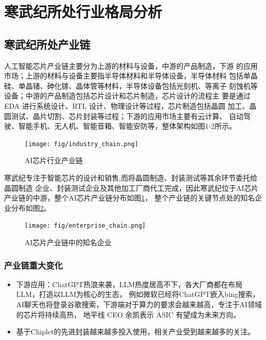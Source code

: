 
\section{寒武纪所处行业格局分析}
\subsection{寒武纪所处产业链}
人工智能芯片产业链主要分为上游的材料与设备，中游的产品制造，下游
的应用市场；上游的材料与设备主要指半导体材料和半导体设备，半导体材料
包括单晶硅、单晶锗、砷化镓、晶体管等材料，半导体设备包括光刻机、等离子
刻蚀机等设备；中游的产品制造包括芯片设计和芯片制造，芯片设计的流程主
要是通过 EDA 进行系统设计、RTL 设计、物理设计等过程，芯片制造包括晶圆
加工、晶圆测试、晶片切割、芯片封装等过程；下游的应用市场主要有云计算、
自动驾驶、智能手机、无人机、智能音箱、智能安防等，整体架构如图1-2所示。\par

\begin{figure}[!htb]
    \centering
    \texttt{[image: fig/industry\_chain.png]}
    \caption{AI芯片行业产业链}
    \label{industry_chain}
  \end{figure}
  寒武纪专注于智能芯片的设计和销售,而将晶圆制造、封装测试等其余环节委托给晶圆制造
  企业、封装测试企业及其他加工厂商代工完成，因此寒武纪位于AI芯片产业链的中游，整个AI芯片产业链分布如图\ref{industry_chain}，
  整个产业链的关键节点处的知名企业分布如图\ref{enterprise_chain}。
  \begin{figure}[!htb]
    \centering
    \texttt{[image: fig/enterprise\_chain.png]}
    \caption{AI芯片产业链中的知名企业}
    \label{enterprise_chain}
  \end{figure}

\subsubsection{产业链重大变化}
\begin{itemize}
    \item 下游应用：ChatGPT热浪来袭，LLM热度居高不下，各大厂商都在布局LLM，打造以LLM为核心的生态，
    例如微软已经将ChatGPT嵌入bing搜索，AI聊天也将登录谷歌搜索，下游端对于算力的要求会越来越高，专注于AI领域的芯片将持续高热，
    地平线 CEO 余凯表示 ASIC 有望成为未来方向。
    \item 基于Chiplet的先进封装越来越多投入使用，相关产业受到越来越多的关注。
\end{itemize}
